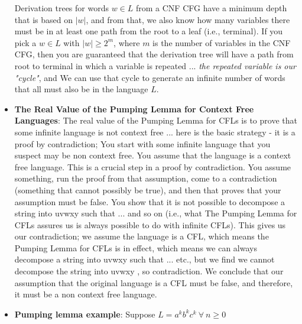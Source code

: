 \documentclass{report}
\begin{document}
\begin{itemize}
                \bigbreak \noindent 
                Derivation trees for words \( w \in L \) from a CNF CFG have a minimum depth that is based on \( |w| \), and from that, we also know how many variables there must be in at least one path from the root to a leaf (i.e., terminal).
                \bigbreak \noindent 
                If you pick a \( w \in L \) with \( |w| \geq 2^m \), where \( m \) is the number of variables in the CNF CFG, then you are guaranteed that the derivation tree will have a path from root to terminal in which a variable is repeated ... \textit{the repeated variable is our "cycle"}, and
                \bigbreak \noindent 
                We can use that cycle to generate an infinite number of words that all must also be in the language \( L \).
            \item \textbf{The Real Value of the Pumping Lemma for Context Free Languages}:
                The real value of the Pumping Lemma for CFLs is to prove that some infinite language is
                not context free ... here is the basic strategy - it is a proof by contradiction;
                \bigbreak \noindent 
                You start with some infinite language that you suspect may be non context free.
                \bigbreak \noindent 
                You assume that the language is a context free language.
                \bigbreak \noindent 
                This is a crucial step in a proof by contradiction. You assume something, run the proof from that
                assumption, come to a contradiction (something that cannot possibly be true), and then that proves that
                your assumption must be false.
                \bigbreak \noindent 
                You show that it is not possible to decompose a string into uvwxy such that ... and so on (i.e.,
                what The Pumping Lemma for CFLs assures us is always possible to do with infinite CFLs).
                \bigbreak \noindent 
                This gives us our contradiction; we assume the language is a CFL, which means the Pumping Lemma for
                CFLs is in effect, which means we can always decompose a string into uvwxy such that ... etc., but we
                find we cannot decompose the string into uvwxy , so contradiction.
                \bigbreak \noindent 
                We conclude that our assumption that the original language is a CFL must be false, and
                therefore, it must be a non context free language.
                \pagebreak 
            \item \textbf{Pumping lemma example}: Suppose $L = a^{k}b^{k}c^{k} \ \forall \ n \geq 0$

\end{itemize}
\end{document}
